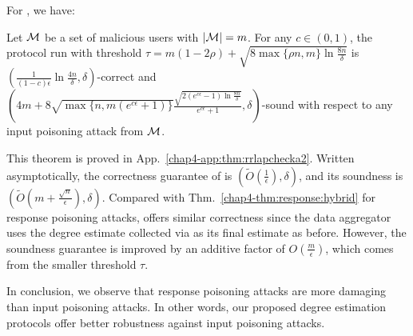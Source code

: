 For \DegHybrid{}, we have: \vspace{-0.2cm}
\begin{thm}\label{chap4-thm:rrlapchecka2}
	Let $\mathcal{M}$ be a set of malicious users with $|\mathcal{M}| = m$. 
  For any $c \in (0,1)$, the \DegHybrid{} protocol run with threshold $\tau = m(1-2\rho) + \sqrt{8 \max\{\rho n, m\} \ln \frac{8n}{\delta}}$ is $(\frac{1}{(1-c)\epsilon}\ln \tfrac{4n}{\delta} ,\delta)$-correct and $(4m+8\sqrt{\max\{n, m(e^{c\epsilon}+1)\}}\frac{\sqrt{2(e^{c\epsilon}-1) \ln \frac{8n}{\delta}}}{e^{c\epsilon}+1}, \delta)$-sound with respect to any input poisoning attack from $\mathcal{M}$. \label{chap4-thm:input:hybrid}
\end{thm}
This theorem is proved in App.~\ref{chap4-app:thm:rrlapchecka2}.
Written asymptotically, the correctness guarantee of \DegHybrid{} is $(\tilde{O}(\frac{1}{\epsilon}), \delta)$, and its soundness is $(\tilde{O}(m + \frac{\sqrt{n}}{\epsilon}), \delta)$.
Compared with Thm.~\ref{chap4-thm:response:hybrid} for response poisoning attacks, \DegHybrid{} offers similar correctness since the data aggregator uses the degree estimate collected via \RLap{} as its final estimate as before. However, the soundness guarantee  is improved by an additive factor of $O(\frac{m}{\epsilon})$, which comes from the smaller threshold $\tau$. %

In conclusion, we observe that response poisoning attacks are more damaging than input poisoning attacks. In other words, our proposed degree estimation protocols offer better robustness against input poisoning attacks.


